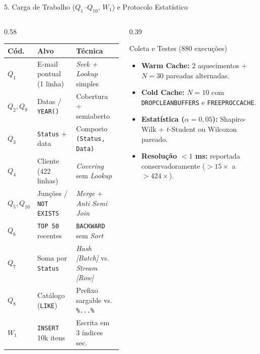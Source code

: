 \documentclass[aspectratio=169,11pt]{beamer}
\begin{document}
\begin{frame}{5. Carga de Trabalho ($Q_1$--$Q_{10}$, $W_1$) e Protocolo Estatístico}
  \begin{columns}[T]
    \begin{column}{0.58\textwidth}
      \scriptsize
      \setlength{\tabcolsep}{3pt}
      \begin{tabular}{@{}lll@{}}
        \toprule
        \textbf{Cód.} & \textbf{Alvo} & \textbf{Técnica} \\
        \midrule
        $Q_1$ & E-mail pontual (1 linha) & \textit{Seek + Lookup} simples \\
        $Q_2, Q_9$ & Datas / \texttt{YEAR()} & Cobertura + semiaberto \\
        $Q_3$ & \texttt{Status} + data & Composto \texttt{(Status, Data)} \\
        $Q_4$ & Cliente (422 linhas) & \textit{Covering} sem \textit{Lookup} \\
        $Q_5, Q_{10}$ & Junções / \texttt{NOT EXISTS} & \textit{Merge} + \textit{Anti Semi Join} \\
        $Q_6$ & \texttt{TOP 50} recentes & \texttt{BACKWARD} sem \textit{Sort} \\
        $Q_7$ & Soma por \texttt{Status} & \textit{Hash [Batch]} vs. \textit{Stream [Row]} \\
        $Q_8$ & Catálogo (\texttt{LIKE}) & Prefixo sargable vs. \texttt{\%...\%} \\
        $W_1$ & \texttt{INSERT} 10k itens & Escrita em 3 índices sec. \\
        \bottomrule
      \end{tabular}
    \end{column}
    \begin{column}{0.39\textwidth}
      \begin{block}{Coleta e Testes (880 execuções)}
        \footnotesize
        \begin{itemize}
          \item \textbf{Warm Cache:} 2 aquecimentos + $N=30$ pareadas alternadas.
          \item \textbf{Cold Cache:} $N=10$ com \texttt{DROPCLEANBUFFERS} e \texttt{FREEPROCCACHE}.
          \item \textbf{Estatística ($\alpha = 0{,}05$):} Shapiro-Wilk + $t$-Student ou Wilcoxon pareado.
          \item \textbf{Resolução $<1$ ms:} reportada conservadoramente ($>15\times$ a $>424\times$).
        \end{itemize}
      \end{block}
    \end{column}
  \end{columns}
\end{frame}
\end{document}
